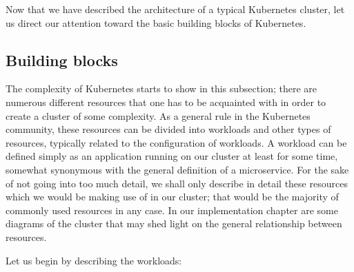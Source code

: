 \documentclass[thesis=B,english]{FITthesis}[2019/12/23]
\begin{document}
Now that we have described the architecture of a typical Kubernetes cluster, let us direct our attention toward the basic building blocks of Kubernetes.

\subsection{Building blocks}

The complexity of Kubernetes starts to show in this subsection; there are numerous different resources that one has to be acquainted with in order to create a cluster of some complexity. As a general rule in the Kubernetes community, these resources can be divided into workloads and other types of resources, typically related to the configuration of workloads. A workload can be defined simply as an application running on our cluster at least for some time, somewhat synonymous with the general definition of a microservice. \cite{kube-workloads} For the sake of not going into too much detail, we shall only describe in detail these resources which we would be making use of in our cluster; that would be the majority of commonly used resources in any case. In our implementation chapter are some diagrams of the cluster that may shed light on the general relationship between resources.

Let us begin by describing the workloads:
\end{document}
